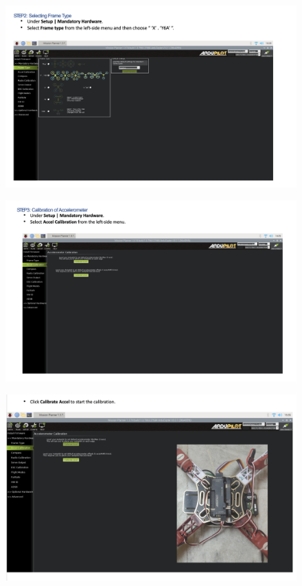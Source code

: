 \begin{figure}[h!]
\centering
\includegraphics[width=\columnwidth]{./Figures/config_img25.png}
\end{figure}

\begin{figure}[h!]
\centering
\includegraphics[width=\columnwidth]{./Figures/config_img26.png}
\end{figure}

\begin{figure}[h!]
\centering
\includegraphics[width=\columnwidth]{./Figures/config_img27.png}
\end{figure}

